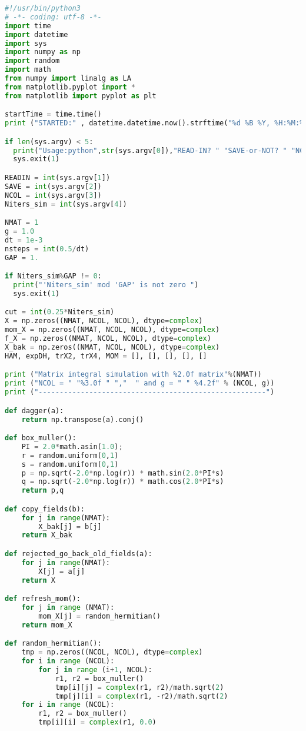 \begin{lstlisting}[language=Python]
#!/usr/bin/python3
# -*- coding: utf-8 -*-
import time 
import datetime 
import sys
import numpy as np
import random
import math
from numpy import linalg as LA
from matplotlib.pyplot import *
from matplotlib import pyplot as plt

startTime = time.time()
print ("STARTED:" , datetime.datetime.now().strftime("%d %B %Y, %H:%M:%S"))

if len(sys.argv) < 5:
  print("Usage:python",str(sys.argv[0]),"READ-IN? " "SAVE-or-NOT? " "NCOL " "NITERS")
  sys.exit(1)

READIN = int(sys.argv[1])
SAVE = int(sys.argv[2])
NCOL = int(sys.argv[3]) 
Niters_sim = int(sys.argv[4])

NMAT = 1
g = 1.0
dt = 1e-3
nsteps = int(0.5/dt) 
GAP = 1.

if Niters_sim%GAP != 0:
  print("'Niters_sim' mod 'GAP' is not zero ")
  sys.exit(1) 

cut = int(0.25*Niters_sim) 
X = np.zeros((NMAT, NCOL, NCOL), dtype=complex)
mom_X = np.zeros((NMAT, NCOL, NCOL), dtype=complex)
f_X = np.zeros((NMAT, NCOL, NCOL), dtype=complex)
X_bak = np.zeros((NMAT, NCOL, NCOL), dtype=complex)
HAM, expDH, trX2, trX4, MOM = [], [], [], [], []

print ("Matrix integral simulation with %2.0f matrix"%(NMAT)) 
print ("NCOL = " "%3.0f " ","  " and g = " " %4.2f" % (NCOL, g)) 
print ("------------------------------------------------------")

def dagger(a):
    return np.transpose(a).conj()

def box_muller():  
    PI = 2.0*math.asin(1.0);    
    r = random.uniform(0,1)
    s = random.uniform(0,1)
    p = np.sqrt(-2.0*np.log(r)) * math.sin(2.0*PI*s)
    q = np.sqrt(-2.0*np.log(r)) * math.cos(2.0*PI*s)
    return p,q

def copy_fields(b):
    for j in range(NMAT):
        X_bak[j] = b[j]
    return X_bak

def rejected_go_back_old_fields(a):
    for j in range(NMAT):
        X[j] = a[j]
    return X

def refresh_mom():
    for j in range (NMAT):
        mom_X[j] = random_hermitian()
    return mom_X

def random_hermitian():
    tmp = np.zeros((NCOL, NCOL), dtype=complex)
    for i in range (NCOL):
        for j in range (i+1, NCOL):
            r1, r2 = box_muller()
            tmp[i][j] = complex(r1, r2)/math.sqrt(2)
            tmp[j][i] = complex(r1, -r2)/math.sqrt(2)
    for i in range (NCOL):
        r1, r2 = box_muller()
        tmp[i][i] = complex(r1, 0.0) 


\end{lstlisting}
